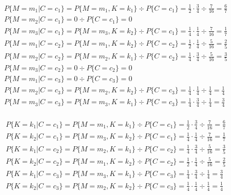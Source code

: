   \begin{align*}
    & P\{M = m_1 | C = c_1\} = P\{M = m_1, K = k_1\} \div P\{C = c_1\} = \frac{1}{2} \cdot \frac{3}{4} \div \frac{7}{16} = \frac{6}{7}\\
    & P\{M = m_2 | C = c_1\} = 0 \div P\{C = c_1\} = 0\\
    & P\{M = m_3 | C = c_1\} = P\{M = m_3, K = k_2\} \div P\{C = c_1\} = \frac{1}{4} \cdot \frac{1}{4} \div \frac{7}{16} = \frac{1}{7}\\
    & P\{M = m_1 | C = c_2\} = P\{M = m_1, K = k_2\} \div P\{C = c_2\} = \frac{1}{2} \cdot \frac{1}{4} \div \frac{5}{16} = \frac{2}{5}\\
    & P\{M = m_2 | C = c_2\} = P\{M = m_2, K = k_1\} \div P\{C = c_2\} = \frac{1}{4} \cdot \frac{3}{4} \div \frac{5}{16} = \frac{3}{5}\\
    & P\{M = m_3 | C = c_2\} = 0 \div P\{C = c_2\} = 0\\
    & P\{M = m_1 | C = c_3\} = 0 \div P\{C = c_3\} = 0\\
    & P\{M = m_2 | C = c_3\} = P\{M = m_2, K = k_2\} \div P\{C = c_3\} = \frac{1}{4} \cdot \frac{1}{4} \div \frac{1}{4} = \frac{1}{4}\\
    & P\{M = m_3 | C = c_3\} = P\{M = m_3, K = k_1\} \div P\{C = c_3\} = \frac{1}{4} \cdot \frac{3}{4} \div \frac{1}{4} = \frac{3}{4}\\
  \end{align*}

  \begin{align*}
    & P\{K = k_1 | C = c_1\} = P\{M = m_1, K = k_1\} \div P\{C = c_1\} = \frac{1}{2} \cdot \frac{3}{4} \div \frac{7}{16} = \frac{6}{7}\\
    & P\{K = k_2 | C = c_1\} = P\{M = m_3, K = k_2\} \div P\{C = c_1\} = \frac{1}{4} \cdot \frac{1}{4} \div \frac{7}{16} = \frac{1}{7}\\
    & P\{K = k_1 | C = c_2\} = P\{M = m_2, K = k_1\} \div P\{C = c_2\} = \frac{1}{4} \cdot \frac{3}{4} \div \frac{5}{16} = \frac{3}{5}\\
    & P\{K = k_2 | C = c_2\} = P\{M = m_1, K = k_2\} \div P\{C = c_2\} = \frac{1}{2} \cdot \frac{1}{4} \div \frac{5}{16} = \frac{2}{5}\\
    & P\{K = k_1 | C = c_3\} = P\{M = m_3, K = k_1\} \div P\{C = c_3\} = \frac{1}{4} \cdot \frac{3}{4} \div \frac{1}{4} = \frac{3}{4}\\
    & P\{K = k_2 | C = c_3\} = P\{M = m_2, K = k_2\} \div P\{C = c_3\} = \frac{1}{4} \cdot \frac{1}{4} \div \frac{1}{4} = \frac{1}{4}\\
  \end{align*}

